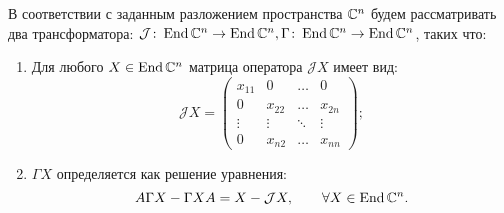 В соответствии с заданным разложением пространства $\mathbb{C}^n$ будем рассматривать два трансформатора: $\mathcal{J}\colon \operatorname{End}\mathbb{C}^n \to \operatorname{End}\mathbb{C}^n, \Gamma\colon \operatorname{End}\mathbb{C}^n \to \operatorname{End}\mathbb{C}^n$, таких что:
\begin{enumerate}
	\item Для любого $X \in \operatorname{End}\mathbb{C}^n$ матрица оператора $\mathcal{J}X$ имеет вид:
	$$
		\mathcal{J}X = \begin{pmatrix}
			x_{11} & 0      & \dots  & 0      \\
			0      & x_{22} & \dots  & x_{2n} \\
			\vdots & \vdots & \ddots & \vdots \\
			0      & x_{n2} & \dots  & x_{nn}
		\end{pmatrix};
	$$
	\item $\Gamma X$ определяется как решение уравнения:
	\begin{equation}\label{eq:gamma_x_rule}
		A\Gamma X - \Gamma X A = X - \mathcal{J}X,\qquad \forall X \in \operatorname{End}\mathbb{C}^n.
	\end{equation}
\end{enumerate}

